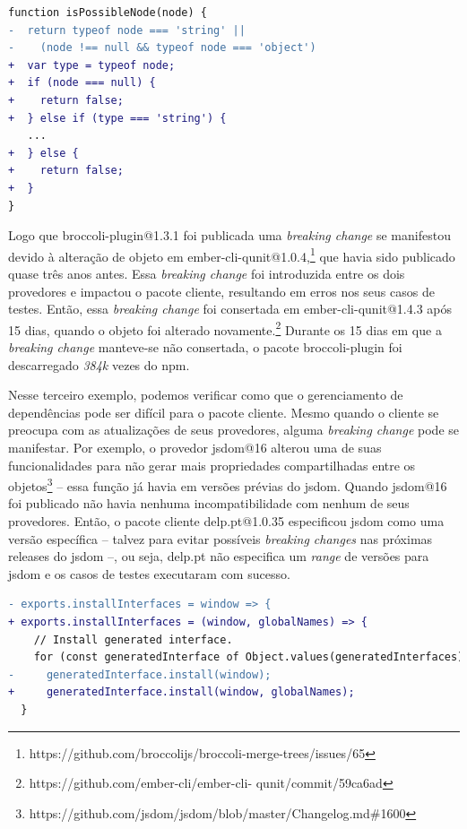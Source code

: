 \begin{lstlisting}[numbers=none, language=diff, label=cod:bc:ember_2, caption={broccoli-plugin@1.3.1 validation function enhanced.}]
 function isPossibleNode(node) {
-  return typeof node === 'string' ||
-    (node !== null && typeof node === 'object')
+  var type = typeof node;
+  if (node === null) {
+    return false;
+  } else if (type === 'string') {
   ...
+  } else {
+    return false;
+  }
}
\end{lstlisting}

Logo que \textsf{broccoli-plugin@1.3.1} foi publicada uma \textit{breaking change} se manifestou devido à alteração de objeto em \textsf{ember-cli-qunit@1.0.4},\footnote{https://github.com/broccolijs/broccoli-merge-trees/issues/65} que havia sido publicado quase três anos antes. Essa \textit{breaking change} foi introduzida entre os dois provedores e impactou o pacote cliente, resultando em erros nos seus casos de testes. Então, essa \textit{breaking change} foi consertada em \textsf{ember-cli-qunit@1.4.3} após 15 dias, quando o objeto foi alterado novamente.\footnote{https://github.com/ember-cli/ember-cli-
qunit/commit/59ca6ad} Durante os 15 dias em que a \textit{breaking change} manteve-se não consertada, o pacote \textsf{broccoli-plugin} foi descarregado \textit{384k} vezes do \textsf{npm}.

Nesse terceiro exemplo, podemos verificar como que o gerenciamento de dependências pode ser difícil para o pacote cliente. Mesmo quando o cliente se preocupa com as atualizações de seus provedores, alguma \textit{breaking change} pode se manifestar. Por exemplo, o provedor \textsf{jsdom@16} alterou uma de suas funcionalidades para não gerar mais propriedades compartilhadas entre os objetos\footnote{https://github.com/jsdom/jsdom/blob/master/Changelog.md\#1600} -- essa função já havia em versões prévias do \textsf{jsdom}. Quando \textsf{jsdom@16} foi publicado não havia nenhuma incompatibilidade com nenhum de seus provedores. Então, o pacote cliente \textsf{delp.pt@1.0.35} especificou \textsf{jsdom} como uma versão específica -- talvez para evitar possíveis \textit{breaking changes} nas próximas releases do \textsf{jsdom} --, ou seja, \textsf{delp.pt} não especifica um \textit{range} de versões para \textsf{jsdom} e os casos de testes executaram com sucesso.

\begin{lstlisting}[numbers=none, language=diff, label=cod:bc:jsdom, caption={\textsf{jsdom@16.3} corrige a função \texttt{installInterface}}]
- exports.installInterfaces = window => {
+ exports.installInterfaces = (window, globalNames) => {
    // Install generated interface.
    for (const generatedInterface of Object.values(generatedInterfaces)) {
-     generatedInterface.install(window);
+     generatedInterface.install(window, globalNames);
  }
\end{lstlisting}

